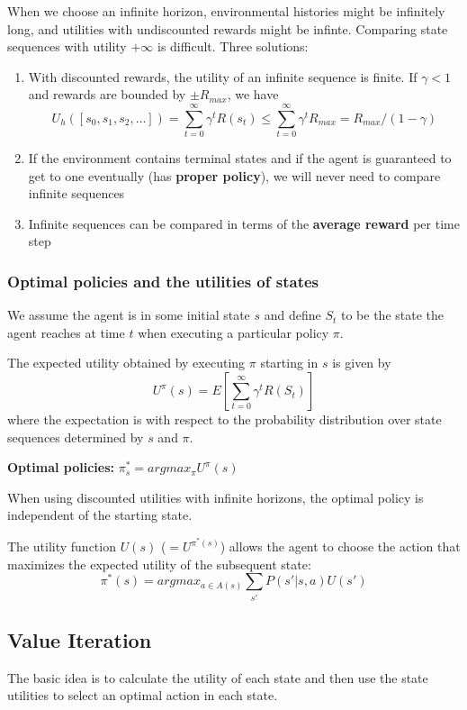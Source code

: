 \documentclass{scrartcl}
\begin{document}
When we choose an infinite horizon, environmental histories might be infinitely long, and utilities with undiscounted rewards might be infinte. Comparing state sequences with utility \(+\infty\) is difficult. Three solutions:
\begin{enumerate}
    \item
        With discounted rewards, the utility of an infinite sequence is finite. If \(\gamma < 1\) and rewards are bounded by \(\pm R_{max}\), we have
        \[U_h([s_0, s_1, s_2, \dots]) = \sum_{t=0}^{\infty} \gamma^t R(s_t) \leq \sum_{t=0} ^{\infty} \gamma^tR_{max} = R_{max}/(1-\gamma)\]
    \item
        If the environment contains terminal states and if the agent is guaranteed to get to one eventually (has \textbf{proper policy}), we will never need to compare infinite sequences
    \item
        Infinite sequences can be compared in terms of the \textbf{average reward} per time step
\end{enumerate}

\subsubsection{Optimal policies and the utilities of states}
We assume the agent is in some initial state \(s\) and define \(S_t\) to be the state the agent reaches at time \(t\) when executing a particular policy \(\pi\).

The expected utility obtained by executing \(\pi\) starting in \(s\) is given by
\[U^{\pi}(s) = E[\sum_{t=0}^{\infty} \gamma^t R(S_t)]\]
where the expectation is with respect to the probability distribution over state sequences determined by \(s\) and \(\pi\).

\textbf{Optimal policies:} \(\pi_s^* = argmax_{\pi} U^{\pi}(s)\)

When using discounted utilities with infinite horizons, the optimal policy is independent of the starting state.

The utility function \(U(s)\) (\(= U^{\pi^*(s)}\)) allows the agent to choose the action that maximizes the expected utility of the subsequent state:
\[\pi^*(s) = argmax_{a \in A(s)} \sum_{s'} P(s'|s,a) U(s')\]

\subsection{Value Iteration}
The basic idea is to calculate the utility of each state and then use the state utilities to select an optimal action in each state.
\end{document}
